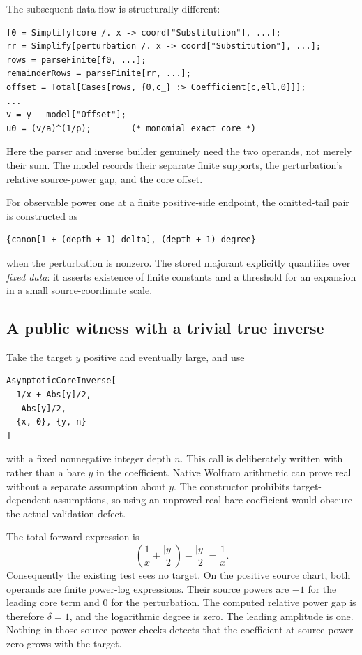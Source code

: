 \documentclass[11pt,a4paper]{article}
\theoremstyle{remark}\newtheorem{remark}[theorem]{Remark}
\newcommand{\code}[1]{\texttt{\detokenize{#1}}}
\begin{document}
The subsequent data flow is structurally different:
\begin{lstlisting}
f0 = Simplify[core /. x -> coord["Substitution"], ...];
rr = Simplify[perturbation /. x -> coord["Substitution"], ...];
rows = parseFinite[f0, ...];
remainderRows = parseFinite[rr, ...];
offset = Total[Cases[rows, {0,c_} :> Coefficient[c,ell,0]]];
...
v = y - model["Offset"];
u0 = (v/a)^(1/p);        (* monomial exact core *)
\end{lstlisting}
Here the parser and inverse builder genuinely need the two operands, not merely
their sum. The model records their separate finite supports, the perturbation's
relative source-power gap, and the core offset.\cite{core}

For observable power one at a finite positive-side endpoint, the omitted-tail
pair is constructed as
\begin{lstlisting}
{canon[1 + (depth + 1) delta], (depth + 1) degree}
\end{lstlisting}
when the perturbation is nonzero. The stored majorant explicitly quantifies over
\emph{fixed data}: it asserts existence of finite constants and a threshold for
an expansion in a small source-coordinate scale.\cite{core}

\subsection{A public witness with a trivial true inverse}

Take the target $y$ positive and eventually large, and use
\begin{lstlisting}
AsymptoticCoreInverse[
  1/x + Abs[y]/2,
  -Abs[y]/2,
  {x, 0}, {y, n}
]
\end{lstlisting}
with a fixed nonnegative integer depth $n$. This call is deliberately written
with \code{Abs[y]} rather than a bare $y$ in the coefficient. Native Wolfram
arithmetic can prove \code{Abs[y]} real without a separate assumption about $y$.
The constructor prohibits target-dependent assumptions, so using an unproved-real
bare coefficient would obscure the actual validation defect.

The total forward expression is
\[
 \left(\frac1x+\frac{|y|}{2}\right)-\frac{|y|}{2}=\frac1x.
\]
Consequently the existing \code{FreeQ} test sees no target. On the positive
source chart, both operands are finite power-log expressions. Their source
powers are $-1$ for the leading core term and $0$ for the perturbation. The
computed relative power gap is therefore $\delta=1$, and the logarithmic
degree is zero. The leading amplitude is one. Nothing in those source-power
checks detects that the coefficient at source power zero grows with the target.
\end{document}
